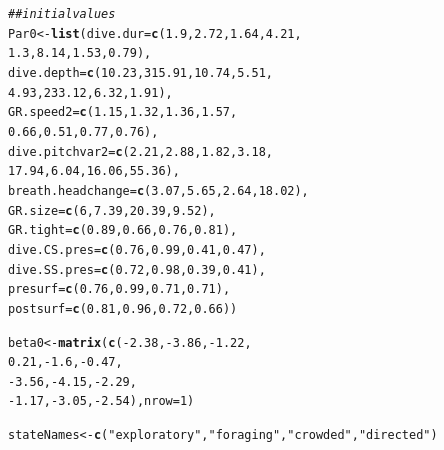 \documentclass[12pt]{article}\usepackage[]{graphicx}\usepackage[]{xcolor}
\makeatletter
\newcommand{\hlnum}[1]{\textcolor[rgb]{0.686,0.059,0.569}{#1}}%
\newcommand{\hlsng}[1]{\textcolor[rgb]{0.192,0.494,0.8}{#1}}%
\newcommand{\hlcom}[1]{\textcolor[rgb]{0.678,0.584,0.686}{\textit{#1}}}%
\newcommand{\hlopt}[1]{\textcolor[rgb]{0,0,0}{#1}}%
\newcommand{\hldef}[1]{\textcolor[rgb]{0.345,0.345,0.345}{#1}}%
\newcommand{\hlkwb}[1]{\textcolor[rgb]{0.69,0.353,0.396}{#1}}%
\newcommand{\hlkwc}[1]{\textcolor[rgb]{0.333,0.667,0.333}{#1}}%
\newcommand{\hlkwd}[1]{\textcolor[rgb]{0.737,0.353,0.396}{\textbf{#1}}}%
\newenvironment{kframe}{%
 \def\at@end@of@kframe{}%
 \ifinner\ifhmode%
  \def\at@end@of@kframe{\end{minipage}}%
  \begin{minipage}{\columnwidth}%
 \fi\fi%
 \def\FrameCommand##1{\hskip\@totalleftmargin \hskip-\fboxsep
 \colorbox{shadecolor}{##1}\hskip-\fboxsep
     \hskip-\linewidth \hskip-\@totalleftmargin \hskip\columnwidth}%
 \MakeFramed {\advance\hsize-\width
   \@totalleftmargin\z@ \linewidth\hsize
   \@setminipage}}%
 {\par\unskip\endMakeFramed%
 \at@end@of@kframe}
\newenvironment{knitrout}{}{} %
\makeatother
\begin{document}
\begin{knitrout}
\begin{kframe}
\begin{alltt}
\hlcom{## initial values}
\hldef{Par0} \hlkwb{<-} \hlkwd{list}\hldef{(}\hlkwc{dive.dur} \hldef{=} \hlkwd{c}\hldef{(}\hlnum{1.9}\hldef{,} \hlnum{2.72}\hldef{,} \hlnum{1.64}\hldef{,} \hlnum{4.21}\hldef{,}
                          \hlnum{1.3}\hldef{,} \hlnum{8.14}\hldef{,} \hlnum{1.53}\hldef{,} \hlnum{0.79}\hldef{),}
             \hlkwc{dive.depth} \hldef{=} \hlkwd{c}\hldef{(}\hlnum{10.23}\hldef{,} \hlnum{315.91}\hldef{,} \hlnum{10.74}\hldef{,} \hlnum{5.51}\hldef{,}
                             \hlnum{4.93}\hldef{,} \hlnum{233.12}\hldef{,}  \hlnum{6.32}\hldef{,} \hlnum{1.91}\hldef{),}
             \hlkwc{GR.speed2} \hldef{=} \hlkwd{c}\hldef{(}\hlnum{1.15}\hldef{,} \hlnum{1.32}\hldef{,} \hlnum{1.36}\hldef{,} \hlnum{1.57}\hldef{,}
                           \hlnum{0.66}\hldef{,} \hlnum{0.51}\hldef{,} \hlnum{0.77}\hldef{,} \hlnum{0.76}\hldef{),}
             \hlkwc{dive.pitchvar2} \hldef{=} \hlkwd{c}\hldef{(} \hlnum{2.21}\hldef{,} \hlnum{2.88}\hldef{,}  \hlnum{1.82}\hldef{,}  \hlnum{3.18}\hldef{,}
                                \hlnum{17.94}\hldef{,} \hlnum{6.04}\hldef{,} \hlnum{16.06}\hldef{,} \hlnum{55.36}\hldef{),}
             \hlkwc{breath.headchange} \hldef{=} \hlkwd{c}\hldef{(}\hlnum{3.07}\hldef{,} \hlnum{5.65}\hldef{,} \hlnum{2.64}\hldef{,} \hlnum{18.02}\hldef{),}
             \hlkwc{GR.size} \hldef{=} \hlkwd{c}\hldef{(}\hlnum{6}\hldef{,} \hlnum{7.39}\hldef{,} \hlnum{20.39}\hldef{,} \hlnum{9.52}\hldef{),}
             \hlkwc{GR.tight} \hldef{=} \hlkwd{c}\hldef{(}\hlnum{0.89}\hldef{,} \hlnum{0.66}\hldef{,} \hlnum{0.76}\hldef{,} \hlnum{0.81}\hldef{),}
             \hlkwc{dive.CS.pres} \hldef{=} \hlkwd{c}\hldef{(}\hlnum{0.76}\hldef{,} \hlnum{0.99}\hldef{,} \hlnum{0.41}\hldef{,} \hlnum{0.47}\hldef{),}
             \hlkwc{dive.SS.pres} \hldef{=} \hlkwd{c}\hldef{(}\hlnum{0.72}\hldef{,} \hlnum{0.98}\hldef{,} \hlnum{0.39}\hldef{,} \hlnum{0.41}\hldef{),}
             \hlkwc{presurf} \hldef{=} \hlkwd{c}\hldef{(}\hlnum{0.76}\hldef{,} \hlnum{0.99}\hldef{,} \hlnum{0.71}\hldef{,} \hlnum{0.71}\hldef{),}
             \hlkwc{postsurf} \hldef{=} \hlkwd{c}\hldef{(}\hlnum{0.81}\hldef{,} \hlnum{0.96}\hldef{,} \hlnum{0.72}\hldef{,} \hlnum{0.66}\hldef{))}

\hldef{beta0} \hlkwb{<-} \hlkwd{matrix}\hldef{(}\hlkwd{c}\hldef{(}\hlopt{-}\hlnum{2.38}\hldef{,} \hlopt{-}\hlnum{3.86}\hldef{,} \hlopt{-}\hlnum{1.22}\hldef{,}
                   \hlnum{0.21}\hldef{,}  \hlopt{-}\hlnum{1.6}\hldef{,} \hlopt{-}\hlnum{0.47}\hldef{,}
                  \hlopt{-}\hlnum{3.56}\hldef{,} \hlopt{-}\hlnum{4.15}\hldef{,} \hlopt{-}\hlnum{2.29}\hldef{,}
                  \hlopt{-}\hlnum{1.17}\hldef{,} \hlopt{-}\hlnum{3.05}\hldef{,} \hlopt{-}\hlnum{2.54}\hldef{),}\hlkwc{nrow}\hldef{=}\hlnum{1}\hldef{)}

\hldef{stateNames} \hlkwb{<-} \hlkwd{c}\hldef{(}\hlsng{"exploratory"}\hldef{,}\hlsng{"foraging"}\hldef{,}\hlsng{"crowded"}\hldef{,}\hlsng{"directed"}\hldef{)}
\end{alltt}
\end{kframe}
\end{knitrout}
\end{document}
